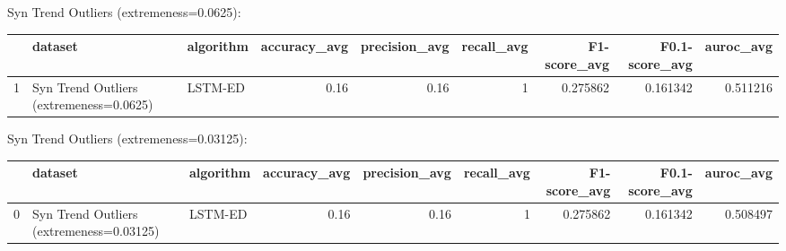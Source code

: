 Syn Trend Outliers (extremeness=0.0625):

\begin{tabular}{rllrrrrrr}
\hline
    & dataset                                 & algorithm   &   accuracy\_avg &   precision\_avg &   recall\_avg &   F1-score\_avg &   F0.1-score\_avg &   auroc\_avg \\
\hline
  1 & Syn Trend Outliers (extremeness=0.0625) & LSTM-ED     &           0.16 &            0.16 &            1 &       0.275862 &         0.161342 &    0.511216 \\
\hline
\end{tabular}

Syn Trend Outliers (extremeness=0.03125):

\begin{tabular}{rllrrrrrr}
\hline
    & dataset                                  & algorithm   &   accuracy\_avg &   precision\_avg &   recall\_avg &   F1-score\_avg &   F0.1-score\_avg &   auroc\_avg \\
\hline
  0 & Syn Trend Outliers (extremeness=0.03125) & LSTM-ED     &           0.16 &            0.16 &            1 &       0.275862 &         0.161342 &    0.508497 \\
\hline
\end{tabular}

